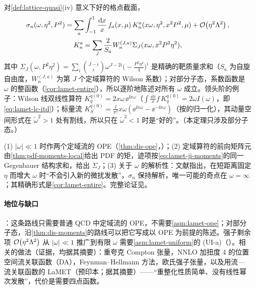 \begin{theorem}\label{thm:lamet-lcs}
对\cref{def:lattice-quasi}(iv) 意义下好的格点截面，
\begin{equation}\label{eq:lamet-lcs}
\begin{gathered}
\sigma_n(\omega,\eta^2,P^2)=\sum_a\int_{-1}^1\frac{\mathrm{d} x}x\,f_a(x,\mu)\,K^a_n(x\omega,\eta^2,x^2P^2,\mu)+\mathcal{O}\!\left(\eta^2\Lambda^2\right),\\
K^a_n=\sum_J\frac2{S_a}W^{(J,a)}_n\Sigma_J(x\omega,x^2P^2\eta^2),
\end{gathered}
\end{equation}
其中 $\Sigma_J(\omega,P^2\eta^2)=\sum_i\binom{J-i}i\omega^{J-2i}\big(-\frac{P^2\eta^2}4\big)^i$ 是精确的靶质量求和（$S_a$ 为自旋自由度，$W^{(J,a)}_n$ 为第 $J$ 个定域算符的 Wilson 系数）；对部分子态，系数函数是 $\omega$ 的整函数（\cref{cor:lamet-entire}），所以逐阶地陈述对所有 $\omega$ 成立。领头阶的例子：Wilson 线双线性算符 $K^{q(0)}_q=2x\omega\,\ee^{\ii x\omega}$（$\int\frac{\dd x}x f\,K^{q(0)}_q=2\omega I(\omega)$，即\cref{eq:lamet-lc-itd}）；标量流 $K^{q(0)}_S=\frac{\ii}{\pi^2}x\omega(\ee^{\ii x\omega}-\ee^{-\ii x\omega})$（按\cite{MaQiu2018}的归一化），其动量空间形式在 $\tilde\omega^2>1$ 处有割线，所以只在 $\tilde\omega^2<1$ 时是“好的”。（本定理只涉及部分子态。）
\end{theorem}

\begin{proofsketch}
(1) $|\omega|\ll1$ 时作两个定域流的 OPE（\cref{thm:dis-ope}，\tagA）；(2) 定域算符的前向矩阵元由\cref{thm:pdf-moments-local}给出 PDF 的矩，迹项按\cref{eq:lamet-ji-moments}的同一 Gegenbauer 结构求和，给出 $\Sigma_J$；(3) 关于 $\omega$ 的解析性：文献\cite{MaQiu2018}指出，在短距离固定 $\eta$ 而增大 $\omega$ 时“不会引入新的微扰发散”，$\sigma_n$ 保持解析，唯一可能的奇点在 $\omega=\infty$；其精确形式是\cref{cor:lamet-entire}。完整论证见\cite{MaQiu2018}。
\end{proofsketch}

\paragraph{地位与缺口}
\tagA：这条路线只需要普通 QCD 中定域流的 OPE，不需要\cref{asm:lamet-ope}；对部分子态，沿\cref{thm:dis-moments}的路线可以把它写成以 OPE 为前提的陈述。强子剩余项 $\mathcal{O}\!\left(\eta^2\Lambda^2\right)$ 从 $|\omega|\ll1$ 推广到有限 $\omega$ 需要\cref{asm:lamet-uniform}的 (UI-a)（\tagC）。相关的做法（证据，均据其摘要）：重夸克 Compton 张量\cite{DetmoldLin2006}，NNLO 加扭度 4 的位置空间流关联函数（DA）\cite{Braun:2007wv}，Feynman--Hellmann 方法\cite{ChambersEtAl2017}，欧氏强子张量\cite{Liu:1993cv}，以及用流—流关联函数的 LaMET\cite{Zhang:2026lle}（预印本；据其摘要）——“重整化性质简单、没有线性幂次发散”，代价是需要四点函数。

